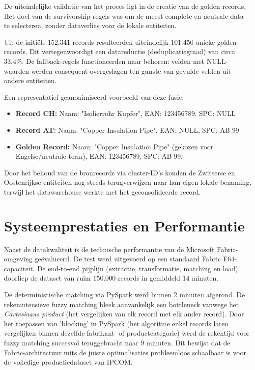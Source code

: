 De uiteindelijke validatie van het proces ligt in de creatie van de golden records. Het doel van de survivorship-regels was om de meest complete en neutrale data te selecteren, zonder dataverlies voor de lokale entiteiten. 

Uit de initiële 152.341 records resulteerden uiteindelijk 101.450 unieke golden records. Dit vertegenwoordigt een datareductie (deduplicatiegraad) van circa 33.4\%. De fallback-regels functioneerden naar behoren: velden met NULL-waarden werden consequent overgeslagen ten gunste van gevulde velden uit andere entiteiten.

Een representatief geanonimiseerd voorbeeld van deze fusie:
\begin{itemize}
    \item \textbf{Record CH:} Naam: "Isolierrohr Kupfer", EAN: 123456789, SPC: NULL
    \item \textbf{Record AT:} Naam: "Copper Insulation Pipe", EAN: NULL, SPC: AB-99
    \item \textbf{Golden Record:} Naam: "Copper Insulation Pipe" (gekozen voor Engelse/neutrale term), EAN: 123456789, SPC: AB-99.
\end{itemize}
Door het behoud van de bronrecords via cluster-ID's konden de Zwitserse en Oostenrijkse entiteiten nog steeds terugverwijzen naar hun eigen lokale benaming, terwijl het datawarehouse werkte met het geconsolideerde record.

\section{Systeemprestaties en Performantie}%
\label{sec:res-performantie}

Naast de datakwaliteit is de technische performantie van de Microsoft Fabric-omgeving geëvalueerd. De test werd uitgevoerd op een standaard Fabric F64-capaciteit. De end-to-end pijplijn (extractie, transformatie, matching en load) doorliep de dataset van ruim 150.000 records in gemiddeld 14 minuten. 

De deterministische matching via PySpark werd binnen 2 minuten afgerond. De rekenintensieve fuzzy matching bleek aanvankelijk een bottleneck vanwege het \textit{Cartesiaans product} (het vergelijken van elk record met elk ander record). Door het toepassen van 'blocking' in PySpark (het algoritme enkel records laten vergelijken binnen dezelfde fabrikant- of productcategorie) werd de rekentijd voor fuzzy matching succesvol teruggebracht naar 9 minuten. Dit bewijst dat de Fabric-architectuur mits de juiste optimalisaties probleemloos schaalbaar is voor de volledige productiedataset van IPCOM.

